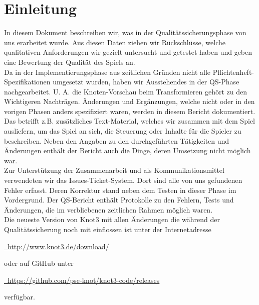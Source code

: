 %



\chapter{Einleitung}
\label{Kapitel:Einleitung}

In diesem Dokument beschreiben wir, was in der Qualitätssicherungsphase von uns erarbeitet wurde. Aus diesen Daten ziehen wir Rückschlüsse, welche qualitativen Anforderungen wir gezielt untersucht und getestet haben und geben eine Bewertung der Qualität des Spiels an.\\

Da in der Implementierungsphase aus zeitlichen Gründen nicht alle Pflichtenheft-Spezifikationen umgesetzt wurden, haben wir Ausstehendes in der QS-Phase nachgearbeitet. U. A. die Knoten-Vorschau beim Transformieren gehört zu den Wichtigeren Nachträgen. Änderungen und Ergänzungen, welche nicht oder in den vorigen Phasen anders spezifiziert waren, werden in diesem Bericht dokumentiert. Das betrifft z.B. zusätzliches Text-Material, welches wir zusammen mit dem Spiel ausliefern, um das Spiel an sich, die Steuerung oder Inhalte für die Spieler zu beschreiben. Neben den Angaben zu den durchgeführten Tätigkeiten und Änderungen enthält der Bericht auch die Dinge, deren Umsetzung nicht möglich war.\\

Zur Unterstützung der Zusammenarbeit und als Kommunikationsmittel verwendeten wir das \glqq Issues\grqq-Ticket-System. Dort sind alle von uns gefundenen Fehler erfasst. Deren Korrektur stand neben dem Testen in dieser Phase im Vordergrund. Der QS-Bericht enthält Protokolle zu den Fehlern, Tests und Änderungen, die im verbliebenen zeitlichen Rahmen möglich waren.\\

Die neueste Version von Knot3 mit allen Änderungen die während der Qualitätssicherung noch mit einflossen ist unter der Internetadresse\\

\begin{center}
\href{http://www.knot3.de/download/}{\mousecursor~http://www.knot3.de/download/}\\
\end{center}

oder auf GitHub unter\\

\begin{center}
\href{https://github.com/pse-knot/knot3-code/releases}{\mousecursor~https://github.com/pse-knot/knot3-code/releases}\\
\end{center}

verfügbar.



